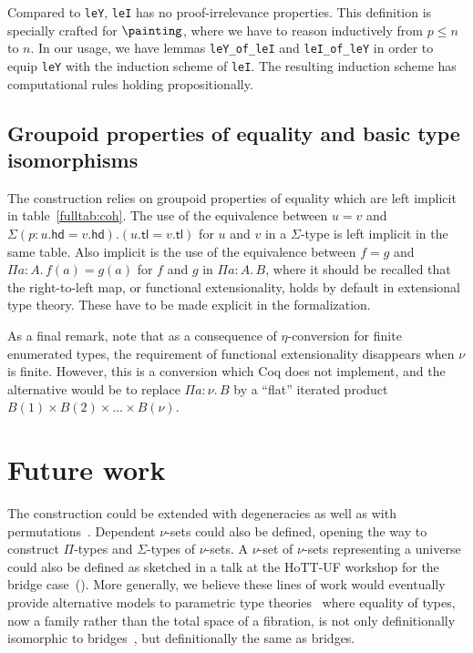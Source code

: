 \documentclass{art.cls/art}
\newcommand{\tl}{\ensuremath{\mathsf{tl}}}
\newcommand{\hd}{\ensuremath{\mathsf{hd}}}
\begin{document}
Compared to \texttt{leY}, \texttt{leI} has no proof-irrelevance properties. This definition is specially crafted for $\painting$, where we have to reason inductively from $p \leq n$ to $n$. In our usage, we have lemmas \texttt{leY\_of\_leI} and \texttt{leI\_of\_leY} in order to equip \texttt{leY} with the induction scheme of \texttt{leI}. The resulting induction scheme has computational rules holding propositionally.

\subsection{Groupoid properties of equality and basic type isomorphisms\label{sec:eqproperties}}
The construction relies on groupoid properties of equality which are left implicit in table~\ref{fulltab:coh}. The use of the equivalence between $u = v$ and $\Sigma (p:u.\hd = v.\hd). (u.\tl = v.\tl)$ for $u$ and $v$ in a $\Sigma$-type is left implicit in the same table. Also implicit is the use of the equivalence between $f = g$ and $\Pi a: A.\, f(a) = g(a)$ for $f$ and $g$ in $\Pi a: A.\, B$, where it should be recalled that the right-to-left map, or functional extensionality, holds by default in extensional type theory. These have to be made explicit in the formalization.

As a final remark, note that as a consequence of $\eta$-conversion for finite enumerated types, the requirement of functional extensionality disappears when $\nu$ is finite. However, this is a conversion which Coq does not implement, and the alternative would be to replace $\Pi a: \nu.\, B$ by a ``flat'' iterated product $B(1) \times B(2) \times \ldots \times B(\nu)$.

\section{Future work}
The construction could be extended with degeneracies as well as with permutations~\cite{grandis03}. Dependent $\nu$-sets could also be defined, opening the way to construct $\Pi$-types and $\Sigma$-types of $\nu$-sets. A $\nu$-set of $\nu$-sets representing a universe could also be defined as sketched in a talk at the HoTT-UF workshop for the bridge case~(\cite{herbelin-hott-uf}). More generally, we believe these lines of work would eventually provide alternative models to parametric type theories~\cite{nuyts17,cavallo19} where equality of types, now a family rather than the total space of a fibration, is not only definitionally isomorphic to bridges~\cite{bernardy15}, but definitionally the same as bridges.
\end{document}

